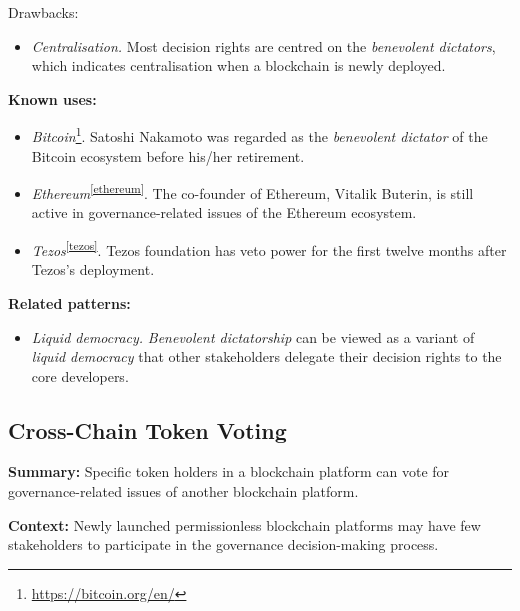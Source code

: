 \documentclass{article}
\begin{document}
Drawbacks:
\begin{itemize}
  \item \textit{Centralisation.} Most decision rights are centred on the \textit{benevolent dictators}, which indicates centralisation when a blockchain is newly deployed.
\end{itemize}



\vspace{0.5em}\noindent \textbf{Known uses:}  
 \begin{itemize}
   \item \textit{Bitcoin}\footnote{\url{https://bitcoin.org/en/}\label{bitcoin}}. Satoshi Nakamoto was regarded as the \textit{benevolent dictator} of the Bitcoin ecosystem before his/her retirement.
   
   \item \textit{Ethereum}\textsuperscript{\ref{ethereum}}. The co-founder of Ethereum, Vitalik Buterin, is still active in governance-related issues of the Ethereum ecosystem.
   
   \item \textit{Tezos}\textsuperscript{\ref{tezos}}. Tezos foundation has veto power for the first twelve months after Tezos's deployment. 
 \end{itemize}


\vspace{0.5em}\noindent \textbf{Related patterns:} 

\begin{itemize}
    \item \textit{Liquid democracy.} \textit{Benevolent dictatorship} can be viewed as a variant of \textit{liquid democracy} that other stakeholders delegate their decision rights to the core developers.
\end{itemize}



\subsection{Cross-Chain Token Voting}

\vspace{0.5em}\noindent \textbf{Summary:} Specific token holders in a blockchain platform can vote for governance-related issues of another blockchain platform.

\vspace{0.5em}\noindent \textbf{Context:} Newly launched permissionless blockchain platforms may have few stakeholders to participate in the governance decision-making process.
\end{document}
